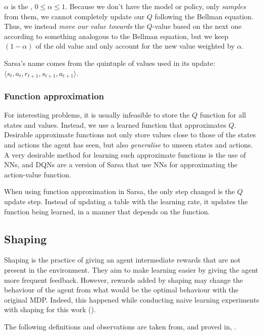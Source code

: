 $\alpha$ is the , $0\leq\alpha\leq 1$. Because we
don't have the model or policy, only \emph{samples} from them, we cannot
completely update our $Q$ following the Bellman equation. Thus, we instead
\emph{move our value towards} the $Q$-value based on the next one according to
something analogous to the Bellman equation, but we keep $(1-\alpha)$ of the old
value and only account for the new value weighted by $\alpha$.

Sarsa's name comes from the quintuple of values used in its update:
$\langle s_t, a_t, r_{t+1}, s_{t+1}, a_{t+1}\rangle$.

\citep[Section~6.4]{sutton1998introduction}

\subsubsection{Function approximation}
For interesting problems, it is usually infeasible to store the $Q$ function for
all states and values. Instead, we use a learned function that approximates $Q$.
Desirable approximate functions not only store values close to those of the states and
actions the agent has seen, but also \emph{generalise} to unseen states and
actions. A very desirable method for learning such approximate functions is the
use of \acfp{NN}, and \acfp{DQN} \citep{mnih2015human} are a version
of Sarsa that use \acp{NN} for approximating the action-value function.

When using function approximation in Sarsa, the only step changed is the $Q$
update step. Instead of updating a table with the learning rate, it updates the
function being learned, in a manner that depends on the function.

\subsection{Shaping\label{subsec:shaping}}
Shaping is the practice of giving an agent intermediate rewards that are not
present in the environment. They aim to make learning easier by giving the agent
more frequent feedback. However, rewards added by shaping may change the
behaviour of the agent from what would be the optimal behaviour with the original
\ac{MDP}. Indeed, this happened while
conducting naive learning experiments with shaping for this work
().

The following definitions and observations are taken from, and proved in,
\citet{ng1999policy}.

